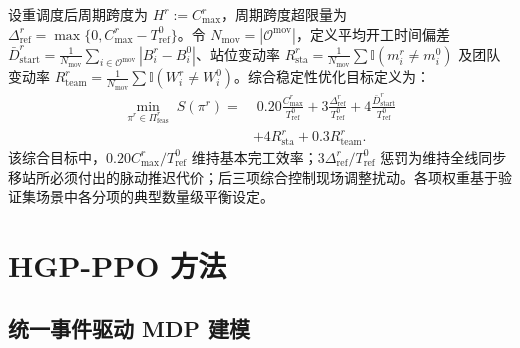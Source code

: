 \documentclass[journal,10pt]{IEEEtran}
\begin{document}
设重调度后周期跨度为 $H^r := C_{\max}^r$，周期跨度超限量为 $\Delta_{\mathrm{ref}}^r = \max\{0, C_{\max}^r - T_{\mathrm{ref}}^0\}$。令 $N_{\mathrm{mov}}=|\mathcal{O}^{\mathrm{mov}}|$，定义平均开工时间偏差 $\bar D_{\mathrm{start}}^r = \frac{1}{N_{\mathrm{mov}}}\sum_{i\in\mathcal{O}^{\mathrm{mov}}} |B_i^r - B_i^0|$、站位变动率 $R_{\mathrm{sta}}^r = \frac{1}{N_{\mathrm{mov}}}\sum \mathbb{I}(m_i^r \ne m_i^0)$ 及团队变动率 $R_{\mathrm{team}}^r = \frac{1}{N_{\mathrm{mov}}}\sum \mathbb{I}(W_i^r \ne W_i^0)$。综合稳定性优化目标定义为：
\begin{equation}\label{eq:reschedule_obj}
\begin{aligned}
\min_{\pi^r\in\Pi_{\mathrm{feas}}^r}\; S(\pi^r) = &\; 0.20\frac{C_{\max}^r}{T_{\mathrm{ref}}^0} + 3\frac{\Delta_{\mathrm{ref}}^r}{T_{\mathrm{ref}}^0} + 4\frac{\bar D_{\mathrm{start}}^r}{T_{\mathrm{ref}}^0} \\
&+ 4 R_{\mathrm{sta}}^r + 0.3 R_{\mathrm{team}}^r.
\end{aligned}
\end{equation}
该综合目标中，$0.20 C_{\max}^r/T_{\mathrm{ref}}^0$ 维持基本完工效率；$3\Delta_{\mathrm{ref}}^r/T_{\mathrm{ref}}^0$ 惩罚为维持全线同步移站所必须付出的脉动推迟代价；后三项综合控制现场调整扰动。各项权重基于验证集场景中各分项的典型数量级平衡设定。

\section{HGP-PPO 方法}\label{sec:method}

\subsection{统一事件驱动 MDP 建模}\label{sec:mdp}
\end{document}
